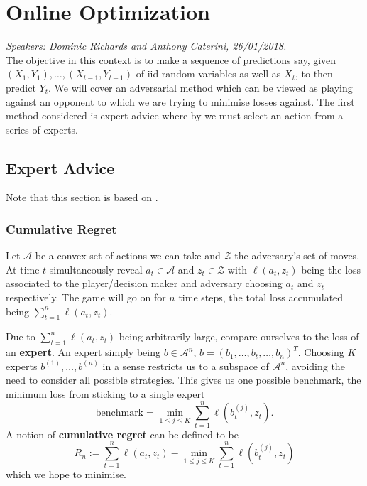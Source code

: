 
\chapter{Online Optimization}
\emph{Speakers: Dominic Richards and Anthony Caterini, 26/01/2018.}\\

The objective in this context is to make a sequence of predictions say, given $(X_1,Y_1),\dots,(X_{t-1},Y_{t-1})$ of iid random variables as well as $X_t$, to then predict $Y_t$. We will cover an adversarial method which can be viewed as playing against an opponent to which we are trying to minimise losses against.  The first method considered is expert advice where by we must select an action from a series of experts.

\section{Expert Advice}

Note that this section is based on \cite[Lecture~15]{rigollet}.

\subsection{Cumulative Regret}

Let $\mathcal{A}$ be a convex set of actions we can take and $\mathcal{Z}$ the adversary's set of moves. At time $t$ simultaneously reveal $a_t \in \mathcal{A}$ and $z_t \in \mathcal{Z}$ with $\ell(a_t,z_t)$  being the loss associated to the player/decision maker and adversary choosing $a_t$ and $z_t$ respectively. The game will go on for $n$ time steps, the total loss accumulated being $\sum_{t=1}^{n} \ell(a_t,z_t)$.

Due to $\sum_{t=1}^{n} \ell(a_t,z_t)$ being arbitrarily large, compare ourselves to the loss of an \textbf{expert}. An expert simply being $b \in \mathcal{A}^n$, $b=(b_1,\dots,b_t,\dots,b_n)^T$. Choosing $K$ experts $b^{(1)},\dots,b^{(n)}$ in a sense restricts us to a subspace of $\mathcal{A}^n$, avoiding the need to consider all possible strategies. This gives us one possible benchmark, the minimum loss from sticking to a single expert
$$
	\text{benchmark} = \min_{1 \leq j \leq K} \sum_{t=1}^n \ell(b_t^{(j)},z_t).
$$
A notion of \textbf{cumulative regret} can be defined to be
$$
	R_n:=
	\sum_{t=1}^{n} \ell(a_t,z_t) - \min_{1 \leq j \leq K} \sum_{t=1}^n \ell(b_t^{(j)},z_t)
$$
which we hope to minimise.

